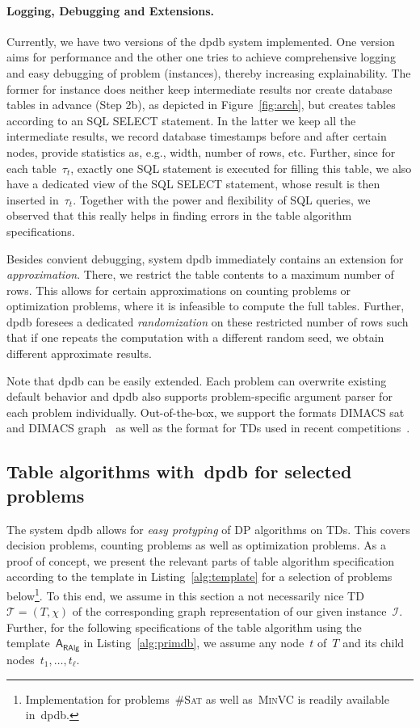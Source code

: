 \documentclass{llncs}
\newcommand{\cSAT}{\textsc{\#Sat}\xspace}%
\newcommand{\VC}{\textsc{MinVC}\xspace}%
\newcommand{\dpdb}{{\small\textsf{dpdb}}\xspace}
\newcommand{\algo}[1]{\ensuremath{\mathsf{#1}}}
\newcommand{\tab}[1]{\ensuremath{\tau_{#1}}}
\begin{document}
\paragraph*{Logging, Debugging and Extensions.} Currently, we have two versions of the \dpdb system implemented.
One version aims for performance and the other one tries to achieve comprehensive logging and easy debugging of problem (instances), thereby increasing explainability.
The former for instance does neither keep intermediate results 
nor create database tables in advance (Step 2b),
as depicted in Figure~\ref{fig:arch}, but creates tables according 
to an SQL {\ttfamily SELECT} statement.
In the latter we keep all the intermediate results, we record database timestamps before and after certain nodes, provide statistics as, e.g., width, number of rows, etc.
Further, since for each table~$\tab{t}$, exactly one SQL statement is executed for filling this table, we also have a dedicated view of the SQL {\ttfamily SELECT} statement, whose result is then inserted in~$\tab{t}$.
Together with the power and flexibility of SQL queries, we observed that this really helps in finding errors in the table algorithm specifications.

Besides convient debugging, system \dpdb immediately
contains an extension for \emph{approximation}.
There, we restrict the table contents to a maximum number of rows.
This allows for certain approximations on counting problems or
optimization problems, where it is infeasible to compute the full tables.
Further, \dpdb foresees a dedicated \emph{randomization} on these restricted number of rows
such that if one repeats the computation with a different random seed,
we obtain different approximate results.

Note that \dpdb can be easily extended. 
Each problem can overwrite existing default behavior and \dpdb also supports
problem-specific argument parser for each problem individually.
Out-of-the-box, we support the formats DIMACS sat and DIMACS graph~\cite{LiuZhongJiao06} as well as the format for TDs used in recent competitions~\cite{DellHusfeldtJansen17a,DellKomusiewiczTalmon18a}.


\subsection{Table algorithms with~\dpdb for selected problems}

The system \dpdb allows for \emph{easy protyping} of DP algorithms on TDs.
This covers decision problems, counting problems as well as optimization problems.
As a proof of concept, we present the relevant parts of table algorithm specification
according to the template in Listing~\ref{alg:template} for a selection of problems below\footnote{Implementation for problems~\cSAT as well as~\VC is readily available in~\dpdb.}.
To this end, we assume in this section a not necessarily nice TD~$\mathcal{T}=(T,\chi)$ of the corresponding graph representation of our given instance~$\mathcal{I}$.
Further, for the following specifications of the table algorithm using the template~$\algo{A_{RAlg}}$ 
in Listing~\ref{alg:primdb}, we assume any node~$t$ of~$T$ and its child nodes~$t_1, \ldots, t_\ell$.
\end{document}

